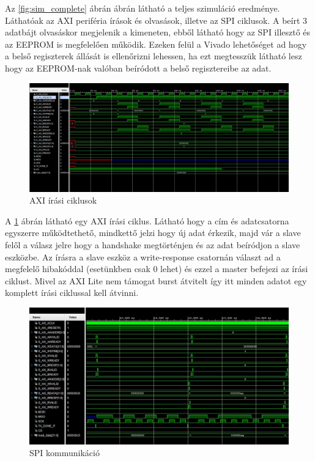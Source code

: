 \documentclass[a4paper,11pt]{article}
\begin{document}
Az \ref{fig:sim_complete} ábrán ábrán látható a teljes szimuláció eredménye. Láthatóak az AXI periféria írások és olvasások, illetve az SPI ciklusok. A beírt 3 adatbájt olvasáskor megjelenik a kimeneten, ebből látható hogy az SPI illesztő és az EEPROM is megfelelően működik. Ezeken felül a Vivado lehetőséget ad hogy a belső regiszterek állását is ellenőrizni lehessen, ha ezt megtesszük látható lesz hogy az EEPROM-nak valóban beíródott a belső regisztereibe az adat.

\begin{figure}[h!]
	\begin{center}
	\includegraphics[scale=0.5]{axi_write.JPG}
	\caption{AXI írási ciklusok}	
	\label{fig:axi_write}
	\end{center}
\end{figure}

A \ref{fig:axi_write} ábrán látható egy AXI írási ciklus. Látható hogy a cím és adatcsatorna egyszerre működtethető, mindkettő jelzi hogy új adat érkezik, majd vár a slave felől a válasz jelre hogy a handshake megtörténjen és az adat beíródjon a slave eszközbe. Az írásra a slave eszköz a write-response csatornán választ ad a megfelelő hibakóddal (esetünkben csak 0 lehet) és ezzel a master befejezi az írási ciklust. Mivel az AXI Lite nem támogat burst átvitelt így itt minden adatot egy komplett írási ciklussal kell átvinni.

\begin{figure}[h!]
	\begin{center}
	\includegraphics[scale=0.7]{SPI.JPG}
	\caption{SPI kommunikáció}
	\label{fig:SPI}
	\end{center}
	
\end{figure}
\end{document}
